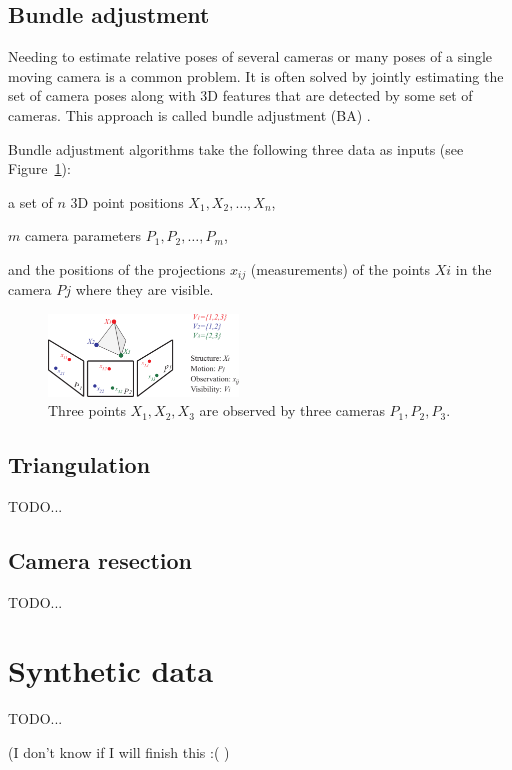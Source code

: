 \subsection{Bundle adjustment}

Needing to estimate relative poses of several cameras or many poses of a single moving camera is a common problem. It is often solved by jointly estimating the set of camera poses along with 3D features that are detected by some set of cameras. This approach is called bundle adjustment (BA) \cite{BA}.

Bundle adjustment algorithms take the following three data as inputs (see Figure~\ref{fig:BA}):
\begin{itemize*}
 \item a set of $n$ 3D point positions $X_1, X_2, \dots, X_n$,
 \item $m$ camera parameters $P_1, P_2, \dots, P_m$,
 \item and the positions of the projections $x_{ij}$ (measurements) of the points $Xi$ in the camera $Pj$ where they are visible.
\end{itemize*}

\begin{figure}[!htbp]
 \centering
 \includegraphics[width=0.45\textwidth]{images/BA.png}
 \caption{Three points $X_1, X_2, X_3$ are observed by three cameras $P_1, P_2, P_3$.}
 \label{fig:BA}
\end{figure}


\subsection{Triangulation}
TODO...

\subsection{Camera resection}
TODO...





\section{Synthetic data}

TODO...

(I don't know if I will finish this :( )
